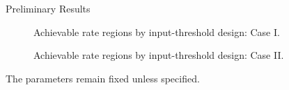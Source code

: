 \documentclass[journal]{IEEEtran}
\begin{document}
\begin{section}{Preliminary Results}
	\begin{figure}[!t]
		\centering
		\caption{Achievable rate regions by input-threshold design: Case I.}
		\label{fi:rate_region_1}
	\end{figure}

	\begin{figure}[!t]
		\centering
		\caption{Achievable rate regions by input-threshold design: Case II.}
		\label{fi:rate_region_2}
	\end{figure}
	The parameters remain fixed unless specified.
\end{section}
\end{document}

